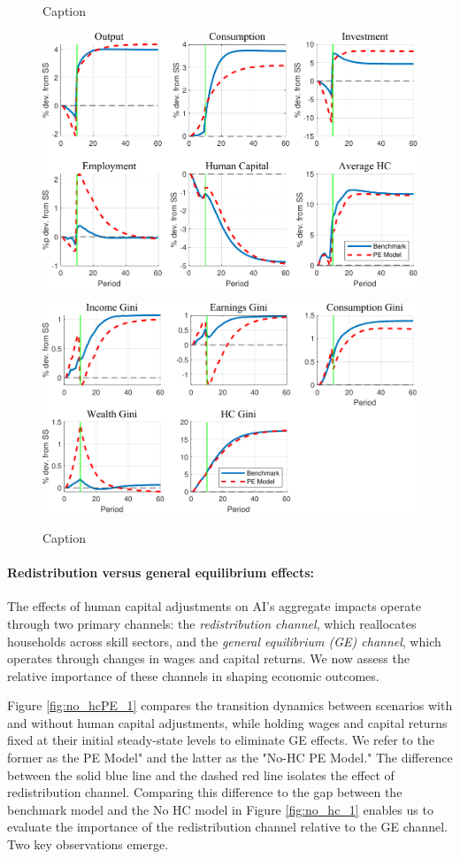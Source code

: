 \documentclass[12pt]{article}
\begin{document}
\begin{figure}
    \centering
    \caption{Caption}
    \includegraphics[width=0.8\linewidth]{figure_204040calib/pe_agg.pdf}    
    \label{fig:placeholder}
    \caption{Caption}
    \includegraphics[width=0.8\linewidth]{figure_204040calib/pe_gini.pdf}
    \label{fig:placeholder}
\end{figure}

\paragraph{Redistribution versus general equilibrium effects:}

The effects of human capital adjustments on AI's aggregate impacts operate through two primary channels: the \textit{redistribution channel}, which reallocates households across skill sectors, and the \textit{general equilibrium (GE) channel}, which operates through changes in wages and capital returns. We now assess the relative importance of these channels in shaping economic outcomes.

Figure \ref{fig:no_hcPE_1} compares the transition dynamics between scenarios with and without human capital adjustments, while holding wages and capital returns fixed at their initial steady-state levels to eliminate GE effects. We refer to the former as the PE Model" and the latter as the "No-HC PE Model." The difference between the solid blue line and the dashed red line isolates the effect of redistribution channel. Comparing this difference to the gap between the benchmark model and the No HC model in Figure \ref{fig:no_hc_1} enables us to evaluate the importance of the redistribution channel relative to the GE channel. Two key observations emerge.
\end{document}
